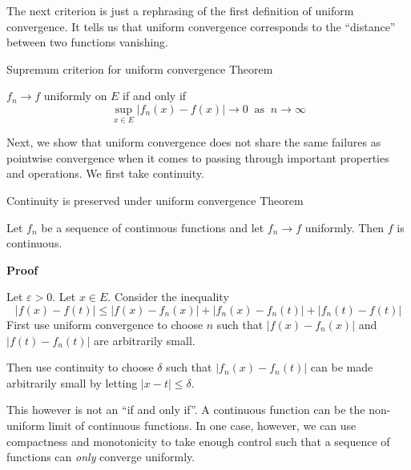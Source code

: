 The next criterion is just a rephrasing of the first definition of uniform convergence. It tells us that uniform convergence corresponds to the ``distance'' between two functions vanishing.

\begin{result}
    {Supremum criterion for uniform convergence}
    {Theorem}

    $f_n \rightarrow f$ uniformly on $E$ if and only if 
    \[\sup_{x \in E}|f_n(x) - f(x)| \rightarrow 0 \:\text{ as }\: n \rightarrow \infty\]
\end{result}

Next, we show that uniform convergence does not share the same failures as pointwise convergence when it comes to passing through important properties and operations. We first take continuity.

\begin{result}
    {Continuity is preserved under uniform convergence}
    {Theorem}

    Let $f_n$ be a sequence of continuous functions and let $f_n \rightarrow f$ uniformly. Then $f$ is continuous.

    \textbf{Proof}

    Let $\varepsilon > 0$. Let $x \in E$. Consider the inequality
    \[|f(x) - f(t)| \leq |f(x) - f_n(x)| + |f_n(x) - f_n(t)| + |f_n(t) - f(t)|\]
First use uniform convergence to choose $n$ such that $|f(x) - f_n(x)|$ and $|f(t) - f_n(t)|$ are arbitrarily small. 

Then use continuity to choose $\delta$ such that $|f_n(x) - f_n(t)|$ can be made arbitrarily small by letting $|x-t| \leq \delta$.
\end{result}

This however is not an ``if and only if''. A continuous function can be the non-uniform limit of continuous functions. In one case, however, we can use compactness and monotonicity to take enough control such that a sequence of functions can \textit{only} converge uniformly.

